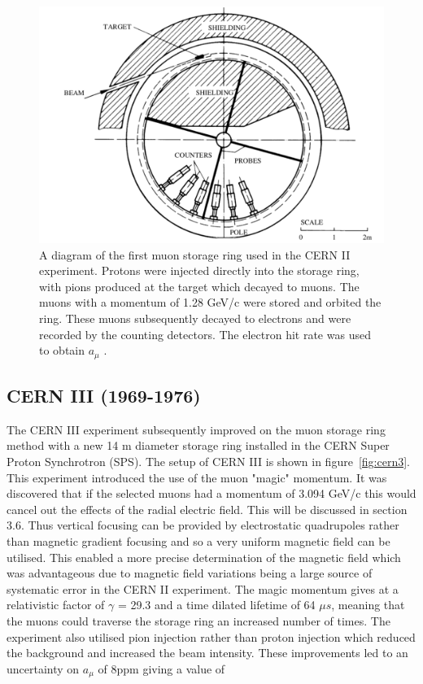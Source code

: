 \begin{figure}[th]
\centering
\includegraphics[scale=0.7]{Figures/cern2}
\decoRule
\caption{A diagram of the first muon storage ring used in the CERN II experiment. Protons were injected directly into the storage ring, with pions produced at the target which decayed to muons. The muons with a momentum of 1.28 GeV/c were stored and orbited the ring. These muons subsequently decayed to electrons and were recorded by the counting detectors. The electron hit rate was used to obtain $a_{\mu}$ \cite{Reference10}.}
\label{fig:cern2}
\end{figure}

\subsection{CERN III (1969-1976)}

The CERN III experiment subsequently improved on the muon storage ring method with a new 14 m diameter storage ring installed in the CERN Super Proton Synchrotron (SPS). The setup of CERN III is shown in figure~\ref{fig:cern3}. This experiment introduced the use of the muon "magic" momentum. It was discovered that if the selected muons had a momentum of 3.094 GeV/c this would cancel out the effects of the radial electric field. This will be discussed in section 3.6. Thus vertical focusing can be provided by electrostatic quadrupoles rather than magnetic gradient focusing and so a very uniform magnetic field can be utilised. This enabled a more precise determination of the magnetic field which was advantageous due to magnetic field variations being a large source of systematic error in the CERN II experiment. The magic momentum gives at a relativistic factor of $\gamma$ = 29.3 and a time dilated lifetime of 64 $\mu{s}$, meaning that the muons could traverse the storage ring an increased number of times. The experiment also utilised pion injection rather than proton injection which reduced the background and increased the beam intensity. These improvements led to an uncertainty on $a_{\mu}$ of 8ppm giving a value of \cite{Reference10}\cite{Reference12}

